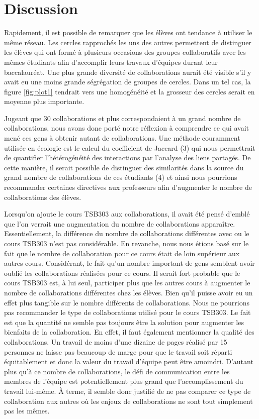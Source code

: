 \documentclass[9pt,twocolumn,twoside,]{pnas-new}
\begin{document}
\hypertarget{discussion}{%
\section{Discussion}\label{discussion}}

Rapidement, il est possible de remarquer que les élèves ont tendance à
utiliser le même réseau. Les cercles rapprochés les uns des autres
permettent de distinguer les élèves qui ont formé à plusieurs occasions
des groupes collaboratifs avec les mêmes étudiants afin d'accomplir
leurs travaux d'équipes durant leur baccalauréat. Une plus grande
diversité de collaborations aurait été visible s'il y avait eu une moins
grande ségrégation de groupes de cercles. Dans un tel cas, la figure
\ref{fig:plot1} tendrait vers une homogénéité et la grosseur des cercles
serait en moyenne plus importante.

Jugeant que 30 collaborations et plus correspondaient à un grand nombre
de collaborations, nous avons donc porté notre réflexion à comprendre ce
qui avait mené ces gens à obtenir autant de collaborations. Une méthode
couramment utilisée en écologie est le calcul du coefficient de Jaccard
(3) qui nous permettrait de quantifier l'hétérogénéité des interactions
par l'analyse des liens partagés. De cette manière, il serait possible
de distinguer des similarités dans la source du grand nombre de
collaborations de ces étudiants (4) et ainsi nous pourrions recommander
certaines directives aux professeurs afin d'augmenter le nombre de
collaborations des élèves.

Lorsqu'on ajoute le cours TSB303 aux collaborations, il avait été pensé
d'emblé que l'on verrait une augmentation du nombre de collaborations
apparaître. Essentiellement, la différence du nombre de collaborations
différentes avec ou le cours TSB303 n'est pas considérable. En revanche,
nous nous étions basé sur le fait que le nombre de collaboration pour ce
cours était de loin supérieur aux autres cours. Considérant, le fait
qu'un nombre important de gens semblent avoir oublié les collaborations
réalisées pour ce cours. Il serait fort probable que le cours TSB303
est, à lui seul, participer plus que les autres cours à augmenter le
nombre de collaborations différentes chez les élèves. Bien qu'il puisse
avoir eu un effet plus tangible sur le nombre différents de
collaborations. Nous ne pourrions pas recommander le type de
collaborations utilisé pour le cours TSB303. Le fait est que la quantité
ne semble pas toujours être la solution pour augmenter les bienfaits de
la collaboration. En effet, il faut également mentionner la qualité des
collaborations. Un travail de moins d'une dizaine de pages réalisé par
15 personnes ne laisse pas beaucoup de marge pour que le travail soit
réparti équitablement et donc la valeur du travail d'équipe peut être
amoindri. D'autant plus qu'à ce nombre de collaborations, le défi de
communication entre les membres de l'équipe est potentiellement plus
grand que l'accomplissement du travail lui-même. À terme, il semble donc
justifié de ne pas comparer ce type de collaboration aux autres où les
enjeux de collaborations ne sont tout simplement pas les mêmes.
\end{document}
